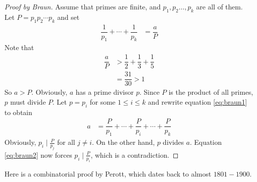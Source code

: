 \documentclass{subfiles}
\begin{document}
		\begin{proof}[Proof by Braun]
			Assume that primes are finite, and $p_1, p_2\ldots,p_k$ are all of them. Let $P=p_1p_2\cdots p_k$ and set
				\begin{align}
					\dfrac1{p_1}+\cdots+\dfrac1{p_k} & =\dfrac a{P}\label{eq:braun1}
				\end{align}
			Note that
				\begin{align*}
					\dfrac aP & > \dfrac12+\dfrac13+\dfrac15\\
					& =\dfrac{31}{30}>1
				\end{align*}
			So $a>P$. Obviously, $a$ has a prime divisor $p$. Since $P$ is the product of all primes, $p$ must divide $P$. Let $p=p_i$ for some $1 \leq i \leq k$ and rewrite equation \eqref{eq:braun1} to obtain
				\begin{align}
					a & =\dfrac P{p_1}+\cdots+\dfrac{P}{p_i}+\cdots+\dfrac P{p_k}\label{eq:braun2}
				\end{align}
			Obviously, $p_i \mid  \frac{P}{p_j}$ for all $j \neq i$. On the other hand, $p$ divides $a$. Equation \eqref{eq:braun2} now forces $p_i \mid  \frac{P}{p_i}$, which is a contradiction.
		\end{proof}
	Here is a combinatorial proof by Perott, which dates back to almost $1801-1900$.
\end{document}
